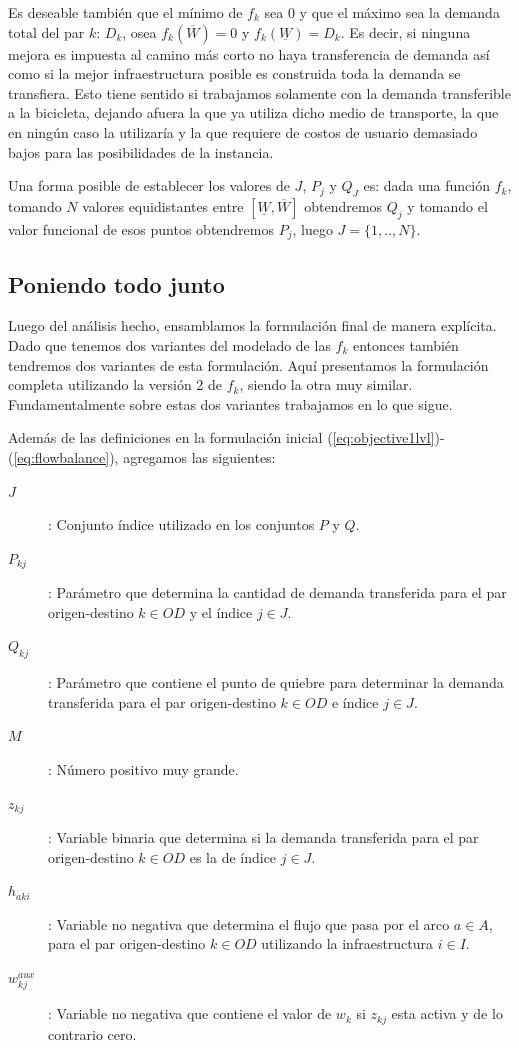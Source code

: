 \documentclass{article}
\begin{document}
  Es deseable también que el mínimo de $f_k$ sea 0 y que el máximo sea la demanda total del par $k$: $D_k$, osea $f_k(\overline{W}) = 0$ y $f_k(\underline{W}) = D_k$. Es decir, si ninguna mejora es impuesta al camino más corto no haya transferencia de demanda así como si la mejor infraestructura posible es construida toda la demanda se transfiera. Esto tiene sentido si trabajamos solamente con la demanda transferible a la bicicleta, dejando afuera la que ya utiliza dicho medio de transporte, la que en ningún caso la utilizaría y la que requiere de costos de usuario demasiado bajos para las posibilidades de la instancia.

  Una forma posible de establecer los valores de $J$, $P_j$ y $Q_J$ es: dada una función $f_k$, tomando $N$ valores equidistantes entre $[\underline{W}, \overline{W}]$ obtendremos $Q_j$ y tomando el valor funcional de esos puntos obtendremos $P_j$, luego $J=\{1,..,N\}$.

  \subsection{Poniendo todo junto}
  \label{sect:alltogether}

  Luego del análisis hecho, ensamblamos la formulación final de manera explícita. Dado que tenemos dos variantes del modelado de las $f_k$ entonces también tendremos dos variantes de esta formulación. Aquí presentamos la formulación completa utilizando la versión 2 de $f_k$, siendo la otra muy similar. Fundamentalmente sobre estas dos variantes trabajamos en lo que sigue.

  Además de las definiciones en la formulación inicial (\ref{eq:objective1lvl})-(\ref{eq:flowbalance}), agregamos las siguientes:

  \begin{description}
    \item[$J$]: Conjunto índice utilizado en los conjuntos $P$ y $Q$.
    \item[$P_{kj}$]: Parámetro que determina la cantidad de demanda transferida para el par origen-destino $k \in OD$ y el índice $j \in J$.
    \item[$Q_{kj}$]: Parámetro que contiene el punto de quiebre para determinar la demanda transferida para el par origen-destino $k \in OD$ e índice $j \in J$.
    \item[$M$]: Número positivo muy grande.
    \item[$z_{kj}$]: Variable binaria que determina si la demanda transferida para el par origen-destino $k \in OD$ es la de índice $j \in J$.
    \item[$h_{aki}$]: Variable no negativa que determina el flujo que pasa por el arco $a \in A$, para el par origen-destino $k \in OD$ utilizando la infraestructura $i \in I$.
    \item[$w^{aux}_{kj}$]: Variable no negativa que contiene el valor de $w_{k}$ si $z_{kj}$ esta activa y de lo contrario cero.
  \end{description}
\end{document}
